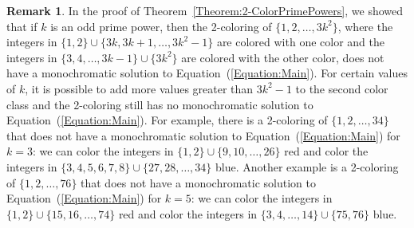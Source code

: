 \documentclass[11pt]{article}
\theoremstyle{definition}
\newtheorem{remark}[theorem]{Remark}
\begin{document}
\begin{remark}
In the proof of Theorem~\ref{Theorem:2-ColorPrimePowers}, we showed that if $k$ is an odd prime power, then the 2-coloring of $\{1,2,\ldots,3k^2\}$, where the integers in $\{1,2\}\cup\{3k,3k+1,\ldots,3k^2-1\}$ are colored with one color and the integers in $\{3,4,\ldots,3k-1\}\cup\{3k^2\}$ are colored with the other color, does not have a monochromatic solution to Equation~(\ref{Equation:Main}). For certain values of $k$, it is possible to add more values greater than $3k^2-1$ to the second color class and the 2-coloring still has no monochromatic solution to Equation~(\ref{Equation:Main}). For example, there is a 2-coloring of $\{1,2,\ldots,34\}$ that does not have a monochromatic solution to Equation~(\ref{Equation:Main}) for $k=3$: we can color the integers in $\{1,2\}\cup\{9,10,\ldots,26\}$ red and color the integers in $\{3,4,5,6,7,8\}\cup\{27,28,\ldots,34\}$ blue. Another example is a 2-coloring of $\{1,2,\ldots,76\}$ that does not have a monochromatic solution to Equation~(\ref{Equation:Main}) for $k=5$: we can color the integers in $\{1,2\}\cup\{15,16,\ldots,74\}$ red and color the integers in $\{3,4,\ldots,14\}\cup\{75,76\}$ blue.
\end{remark}
\end{document}
